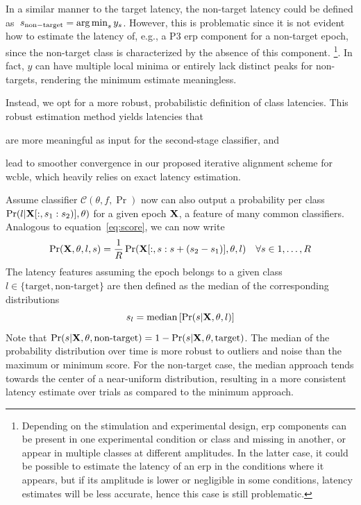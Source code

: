 In a similar manner to the target latency, the non-target latency could be defined
as~$s_\mathrm{non-target}=\operatorname*{arg\,min}_s{y_s}$.
However, this is problematic since it is not evident how to estimate
the latency of, e.g., a P3 \ac{erp} component for a non-target epoch, since the
non-target class is characterized by the absence of this component.
\footnote{Depending on the stimulation and experimental design, \ac{erp} components can be present in one experimental
	condition or class and missing in another, or appear in multiple classes
	at different amplitudes. In the latter case, it could be possible
	to estimate the latency of an \ac{erp} in the conditions where it appears, but if
	its amplitude is lower or negligible in some conditions, latency estimates
	will be less accurate, hence this case is still problematic.}.
In fact, $y$ can have multiple local minima or entirely lack distinct peaks for
non-targets, rendering the minimum estimate meaningless.

Instead, we opt for a more robust, probabilistic definition of class latencies.
This robust estimation method yields latencies that
\begin{enumerate*}[label=(\arabic*)]
  \item are more meaningful as input for the second-stage
    classifier, and
  \item lead to smoother convergence in our proposed iterative alignment scheme
    for \ac{wcble}, which heavily relies on exact latency estimation.
\end{enumerate*}
Assume classifier $\mathcal{C}(\theta,f,\Pr)$ now can also output a probability
per class $\Pr(l|
\mathbf{X}[:,s_1:s_2)], \theta)$ for a given epoch $\mathbf{X}$, a feature of many
common classifiers.
Analogous to equation~\ref{eq:score}, we can now write
\begin{equation}
\Pr(\mathbf{X},\theta,l,s) = \frac{1}{R}\Pr(\mathbf{X}[:,s:s+(s_2-s_1)],\theta,l)
  \quad \forall s\in 1,\ldots,R
	\label{eq:prob}
\end{equation}
The latency features assuming the epoch belongs to a given class
$l\in\{\textrm{target}, \textrm{non-target}\}$ are then defined as the median of
the corresponding distributions
\begin{equation}
  s_l =\mathrm{median}\left[\Pr(s|\mathbf{X},\theta,l) \right]
  \label{eq:prob-latency}
\end{equation}
Note that $\Pr(s|\mathbf{X},\theta,\textrm{non-target}) =1-
  \Pr(s|\mathbf{X},\theta,\mathrm{target})$.
The median of the probability distribution over time is more robust to
outliers and noise than the maximum or minimum score.
For the non-target case, the median approach tends towards the center of a
near-uniform distribution, resulting in a more consistent latency estimate over
trials as compared to the minimum approach.


